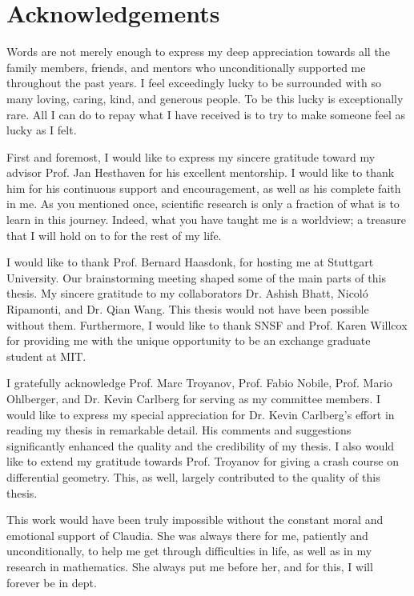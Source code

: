 \chapter*{Acknowledgements}
Words are not merely enough to express my deep appreciation towards all the family members, friends, and mentors who unconditionally supported me throughout the past years. I feel exceedingly lucky to be surrounded with so many loving, caring, kind, and generous people. To be this lucky is exceptionally rare. All I can do to repay what I have received is to try to make someone feel as lucky as I felt.


First and foremost, I would like to express my sincere gratitude toward my advisor Prof. Jan Hesthaven for his excellent mentorship. I would like to thank him for his continuous support and encouragement, as well as his complete faith in me. As you mentioned once, scientific research is only a fraction of what is to learn in this journey. Indeed, what you have taught me is a worldview; a treasure that I will hold on to for the rest of my life.

I would like to thank Prof. Bernard Haasdonk, for hosting me at Stuttgart University. Our brainstorming meeting shaped some of the main parts of this thesis. My sincere gratitude to my collaborators Dr. Ashish Bhatt, Nicol\'o Ripamonti, and Dr. Qian Wang. This thesis would not have been possible without them. Furthermore, I would like to thank SNSF and Prof. Karen Willcox for providing me with the unique opportunity to be an exchange graduate student at MIT.



I gratefully acknowledge Prof. Marc Troyanov, Prof. Fabio Nobile, Prof. Mario Ohlberger, and Dr. Kevin Carlberg for serving as my committee members. I would like to express my special appreciation for Dr. Kevin Carlberg's effort in reading my thesis in remarkable detail. His comments and suggestions significantly enhanced the quality and the credibility of my thesis. I also would like to extend my gratitude towards Prof. Troyanov for giving a crash course on differential geometry. This, as well, largely contributed to the quality of this thesis. 


This work would have been truly impossible without the constant moral and emotional support of Claudia. She was always there for me, patiently and unconditionally, to help me get through difficulties in life, as well as in my research in mathematics. She always put me before her, and for this, I will forever be in dept.


